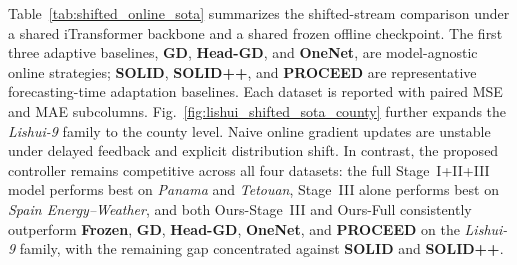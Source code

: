 ﻿\documentclass[journal]{IEEEtran}
\newenvironment{auditproblemblock}{\begingroup\color{red}}{\endgroup}
\begin{document}
\begin{auditproblemblock}
Table~\ref{tab:shifted_online_sota} summarizes the shifted-stream comparison under a shared iTransformer backbone and a shared frozen offline checkpoint. The first three adaptive baselines, \textbf{GD}, \textbf{Head-GD}, and \textbf{OneNet}, are model-agnostic online strategies; \textbf{SOLID}, \textbf{SOLID++}, and \textbf{PROCEED} are representative forecasting-time adaptation baselines. Each dataset is reported with paired MSE and MAE subcolumns. Fig.~\ref{fig:lishui_shifted_sota_county} further expands the \textit{Lishui-9} family to the county level. Naive online gradient updates are unstable under delayed feedback and explicit distribution shift. In contrast, the proposed controller remains competitive across all four datasets: the full Stage~I+II+III model performs best on \textit{Panama} and \textit{Tetouan}, Stage~III alone performs best on \textit{Spain Energy--Weather}, and both Ours-Stage~III and Ours-Full consistently outperform \textbf{Frozen}, \textbf{GD}, \textbf{Head-GD}, \textbf{OneNet}, and \textbf{PROCEED} on the \textit{Lishui-9} family, with the remaining gap concentrated against \textbf{SOLID} and \textbf{SOLID++}.


\end{auditproblemblock}
\end{document}
